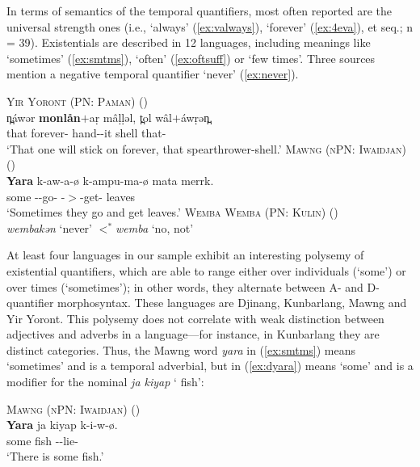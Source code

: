 \documentclass[12pt,egregdoesnotlikesansseriftitles]{scrartcl}
\begin{document}
In terms of semantics of the temporal quantifiers, most often reported are the universal strength ones (i.e., `always' (\ref{ex:valways}), `forever' (\ref{ex:4eva}), et seq.; n = 39). %
Existentials are described in 12 languages, including meanings like `sometimes' (\ref{ex:smtms}), `often' (\ref{ex:oftsuff}) or `few times'. Three sources mention a negative temporal quantifier `never' (\ref{ex:never}).
\begin{exe}
  \ex\label{ex:4eva} \textsc{Yir Yoront (PN: Paman)} (\citealt[343]{alpher73})\\
  \gll n̪\'awər \textbf{monlån}$+$a\d{r} m\^a\d{l}\d{l}əl, t̪ol w\^al$+$\'aw\d{r}ən̪.\\
  that forever-\Sel{} hand-\Np-it shell that-\Sub\\
  \glt `That one will stick on forever, that spearthrower-shell.'
  \ex\label{ex:smtms} \textsc{Mawng (nPN: Iwaidjan)} (\citealt{ngaralk})\\
  \gll \textbf{Yara} k-aw-a-ø k-ampu-ma-ø mata merrk.\\
  some \Prs-\Tpl-go-\Np{} \Prs-\Tpl$>$\Third\Clveg-get-\Np{} \Clveg{} leaves\\
  \glt `Sometimes they go and get leaves.' %
  \ex\label{ex:never} \textsc{Wemba Wemba (PN: Kulin)} (\citealt[47]{hercus92})\\
  \textit{\charis wembakən} `never' $<^*$\textit{wemba} `no, not'
\end{exe}

At least four languages in our sample exhibit an interesting polysemy of existential quantifiers, which are able to range either over individuals (`some') or over times (`sometimes'); in other words, they alternate between A- and D-quantifier morphosyntax. These languages are Djinang, Kunbarlang, Mawng and Yir Yoront. This polysemy does not correlate with weak distinction between adjectives and adverbs in a language---for instance, in Kunbarlang they are distinct categories. Thus, the Mawng word \textit{yara} in (\ref{ex:smtms}) means `sometimes' and is a temporal adverbial, but in (\ref{ex:dyara}) means `some' and is a modifier for the nominal \textit{ja kiyap} `\Clm{} fish':
\begin{exe}
  \ex\label{ex:dyara} \textsc{Mawng (nPN: Iwaidjan)} (\citealt{ngaralk})\\
  \gll \textbf{Yara} ja kiyap k-i-w-ø.\\
  some \Clm{} fish \Prs-\Tsg\Clm-lie-\Np\\
  \glt `There is some fish.' %
\end{exe}
\end{document}
